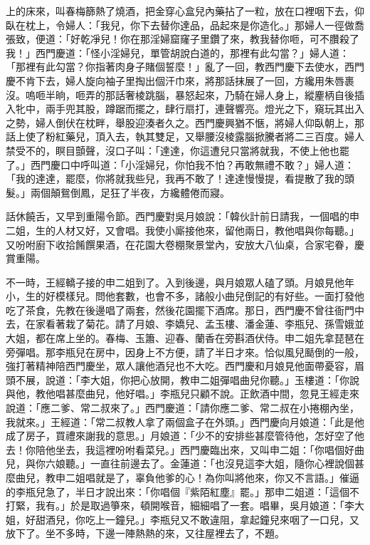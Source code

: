 上的床來，叫春梅篩熱了燒酒，把金穿心盒兒內藥拈了一粒，放在口裡咽下去，仰臥在枕上，令婦人：「我兒，你下去替你達品，品起來是你造化。」那婦人一徑做喬張致，便道：「好乾凈兒！你在那淫婦窟窿子里鑽了來，教我替你咂，可不臢殺了我！」西門慶道：「怪小淫婦兒，單管胡說白道的，那裡有此勾當？」婦人道： 「那裡有此勾當？你指著肉身子賭個誓麼！」亂了一回，教西門慶下去使水，西門慶不肯下去，婦人旋向袖子里掏出個汗巾來，將那話抹展了一回，方纔用朱唇裹沒。嗚咂半晌，咂弄的那話奢棱跳腦，暴怒起來，乃騎在婦人身上，縱麈柄自後插入牝中，兩手兜其股，蹲踞而擺之，肆行扇打，連聲響亮。燈光之下，窺玩其出入之勢，婦人倒伏在枕畔，舉股迎湊者久之。西門慶興猶不愜，將婦人仰臥朝上，那話上使了粉紅藥兒，頂入去，執其雙足，又舉腰沒棱露腦掀騰者將二三百度。婦人禁受不的，瞑目顫聲，沒口子叫：「達達，你這遭兒只當將就我，不使上他也罷了。」西門慶口中呼叫道：「小淫婦兒，你怕我不怕？再敢無禮不敢？」婦人道： 「我的達達，罷麼，你將就我些兒，我再不敢了！達達慢慢提，看提散了我的頭髮。」兩個顛鴛倒鳳，足狂了半夜，方纔體倦而寢。

話休饒舌，又早到重陽令節。西門慶對吳月娘說：「韓伙計前日請我，一個唱的申二姐，生的人材又好，又會唱。我使小廝接他來，留他兩日，教他唱與你每聽。」又吩咐廚下收拾餚饌果酒，在花園大卷棚聚景堂內，安放大八仙桌，合家宅眷，慶賞重陽。

不一時，王經轎子接的申二姐到了。入到後邊，與月娘眾人磕了頭。月娘見他年小，生的好模樣兒。問他套數，也會不多，諸般小曲兒倒記的有好些。一面打發他吃了茶食，先教在後邊唱了兩套，然後花園擺下酒席。那日，西門慶不曾往衙門中去，在家看著栽了菊花。請了月娘、李嬌兒、孟玉樓、潘金蓮、李瓶兒、孫雪娥並大姐，都在席上坐的。春梅、玉簫、迎春、蘭香在旁斟酒伏侍。申二姐先拿琵琶在旁彈唱。那李瓶兒在房中，因身上不方便，請了半日才來。恰似風兒颳倒的一般，強打著精神陪西門慶坐，眾人讓他酒兒也不大吃。西門慶和月娘見他面帶憂容，眉頭不展，說道：「李大姐，你把心放開，教申二姐彈唱曲兒你聽。」玉樓道：「你說與他，教他唱甚麼曲兒，他好唱。」李瓶兒只顧不說。正飲酒中間，忽見王經走來說道：「應二爹、常二叔來了。」西門慶道：「請你應二爹、常二叔在小捲棚內坐，我就來。」王經道：「常二叔教人拿了兩個盒子在外頭。」西門慶向月娘道：「此是他成了房子，買禮來謝我的意思。」月娘道：「少不的安排些甚麼管待他，怎好空了他去！你陪他坐去，我這裡吩咐看菜兒。」西門慶臨出來，又叫申二姐：「你唱個好曲兒，與你六娘聽。」一直往前邊去了。金蓮道：「也沒見這李大姐，隨你心裡說個甚麼曲兒，教申二姐唱就是了，辜負他爹的心！為你叫將他來，你又不言語。」催逼的李瓶兒急了，半日才說出來：「你唱個『紫陌紅塵』罷。」那申二姐道：「這個不打緊，我有。」於是取過箏來，頓開喉音，細細唱了一套。唱畢，吳月娘道：「李大姐，好甜酒兒，你吃上一鐘兒。」李瓶兒又不敢違阻，拿起鐘兒來咽了一口兒，又放下了。坐不多時，下邊一陣熱熱的來，又往屋裡去了，不題。

